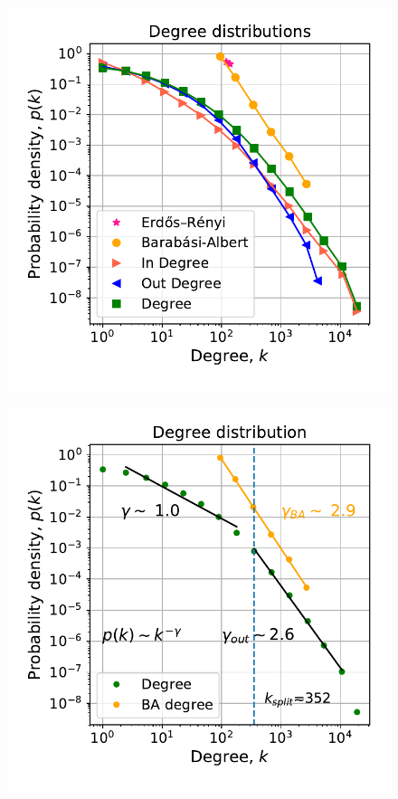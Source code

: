 \documentclass[12pt, twoside]{report}
\begin{document}
\begin{minipage}[b]{0.5\textwidth}
   \centering
    \begin{figure}[H]
      \includegraphics[width=\textwidth]{../../scripts/visualization/imgs/degree_distributions.pdf}            
          \caption{}
        \label{fig:in_degree}
\end{figure}
\end{minipage}
\begin{minipage}[b]{0.5\textwidth}
  \begin{figure}[H]
  \centering
  \includegraphics[width=\textwidth]{../../scripts/visualization/imgs/tot_degree_distribution.pdf}            
        \caption{}
\label{fig:out_degree}
\end{figure}
\end{minipage}
\end{document}
